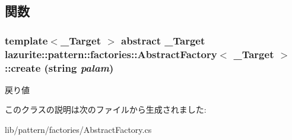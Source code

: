 \subsection{関数}
\hypertarget{classlazurite_1_1pattern_1_1factories_1_1_abstract_factory_3_01___target_01_4_ae63884fb3ce2751090e0b40e761a043b}{
\subsubsection[{create}]{\setlength{\rightskip}{0pt plus 5cm}template$<$\_\-Target $>$ abstract \_\-Target lazurite::pattern::factories::AbstractFactory$<$ \_\-Target $>$::create (string {\em palam})}}
\label{classlazurite_1_1pattern_1_1factories_1_1_abstract_factory_3_01___target_01_4_ae63884fb3ce2751090e0b40e761a043b}
\begin{DoxyReturn}{戻り値}

\end{DoxyReturn}


このクラスの説明は次のファイルから生成されました:\begin{DoxyCompactItemize}
\item 
lib/pattern/factories/AbstractFactory.cs\end{DoxyCompactItemize}
